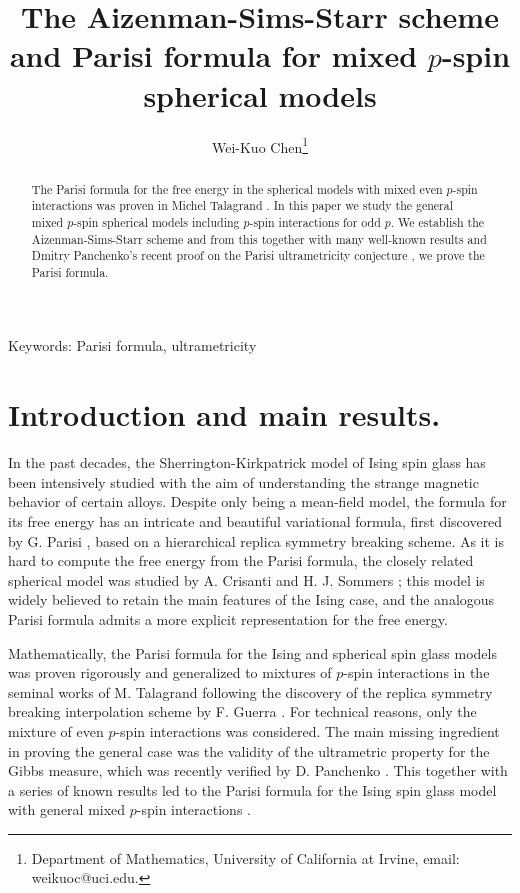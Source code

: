 \documentclass[12pt]{article}
\newenvironment{Proof of lemma}{\noindent{\bf Proof of Lemma}}{\hfill$\Box$\newline}
\newenvironment{Proof of theorem}{\noindent{\bf Proof of Theorem}}{\hfill{\footnotesize${\square}$}\newline}
\newenvironment{Proof of theorems}{\noindent{\bf Proof of Theorems}}{\hfill$\Box$\newline}
\newenvironment{Proof of proposition}{\noindent{\bf Proof of Proposition}}{\hfill$\Box$\newline}
\newenvironment{Proof of propositions}{\noindent{\bf Proof of Propositions}}{\hfill$\Box$\newline}
\newenvironment{Proof of exercise}{\noindent{\it Proof of Exercise:}}{\hfill$\Box$}
\numberwithin{equation}{section}
\begin{document}
\title{The Aizenman-Sims-Starr scheme and Parisi formula for mixed $p$-spin spherical models}
\author{Wei-Kuo Chen\footnote{Department of Mathematics, University of California at Irvine, email: weikuoc@uci.edu.}}


\maketitle

\begin{abstract}  
The Parisi formula for the free energy in the spherical models with mixed even $p$-spin interactions was proven in Michel Talagrand \cite{Tal061}. 
In this paper we study the general mixed $p$-spin spherical models including $p$-spin interactions for odd $p$. We establish the Aizenman-Sims-Starr scheme and from this together with many well-known results and Dmitry Panchenko's recent proof on the Parisi ultrametricity conjecture \cite{Pan11:4}, we prove the Parisi formula.
\end{abstract}

{Keywords: Parisi formula, ultrametricity}



\section{Introduction and main results.}

In the past decades, the Sherrington-Kirkpatrick model \cite{SK72} of Ising spin glass has been intensively studied  with the aim of understanding the strange magnetic behavior of certain alloys. Despite only being a mean-field model, the formula for its free energy has an intricate and beautiful variational formula, first discovered by G. Parisi \cite{Parisi79,Parisi80}, based on a hierarchical replica symmetry breaking scheme. As it is hard to compute the free energy from the Parisi formula, the closely related spherical model was studied by A. Crisanti and H. J. Sommers \cite{CS92}; this model is widely believed to retain the main features of the Ising case, and the analogous Parisi formula admits a more explicit representation for the free energy.

Mathematically, the Parisi formula for the Ising and spherical spin glass models was proven rigorously and generalized to mixtures of $p$-spin interactions  in the seminal works of M. Talagrand \cite{Tal061,Tal06} following the discovery of the replica symmetry breaking interpolation scheme by F. Guerra \cite{Guerra03}. For technical reasons, only the mixture of even $p$-spin interactions was considered. The main missing ingredient in proving the general case was the validity of the ultrametric property for the Gibbs measure, which was recently verified by D. Panchenko \cite{Pan11:4}. This together with a series of known results led to the Parisi formula for the Ising spin glass model with general mixed $p$-spin interactions \cite{Pan11:1}.
\end{document}
